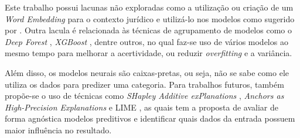 Este trabalho possui lacunas não exploradas como a utilização ou criação de um \textit{Word Embedding} para o contexto jurídico e utilizá-lo nos modelos como sugerido por . Outra lacula é relacionada às técnicas de agrupamento de modelos como o \textit{Deep Forest} \cite{zhou_deep_2017}, \textit{XGBoost} \cite{chen_xgboost:_2016}, dentre outros, no qual faz-se uso de vários modelos ao mesmo tempo para melhorar a acertividade, ou reduzir \textit{overfitting} e a variância.

Além disso, os modelos neurais são caixas-pretas, ou seja, não se sabe como ele utiliza os dados para predizer uma categoria. Para trabalhos futuros, também propõe-se o uso de técnicas como \textit{SHapley Additive exPlanations} \cite{NIPS2017_7062}, \textit{Anchors as High-Precision Explanations} \cite{marco_tulio__ribeiro_anchors:_2018} e LIME \cite{lime}, as quais tem a  proposta de avaliar de forma agnóstica modelos preditivos e identificar quais dados da entrada possuem maior influência no resultado.
